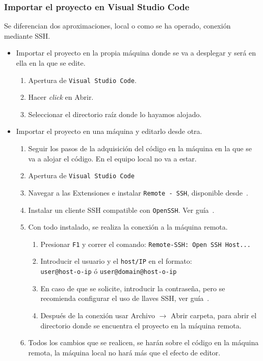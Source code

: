 \subsubsection{Importar el proyecto en Visual Studio Code}
Se diferencian dos aproximaciones, local o como se ha operado, conexión mediante SSH.

\begin{itemize}
\item Importar el proyecto en la propia máquina donde se va a desplegar y será en ella en la que se edite.
\begin{enumerate}
\item Apertura de \texttt{Visual Studio Code}.
\item Hacer \textit{click} en Abrir.
\item Seleccionar el directorio raíz donde lo hayamos alojado.
\end{enumerate}
\item Importar el proyecto en una máquina y editarlo desde otra.
\begin{enumerate}
\item Seguir los pasos de la adquisición del código en la máquina en la que se va a alojar el código. En el equipo local no va a estar.
\item Apertura de \texttt{Visual Studio Code}
\item Navegar a las Extensiones e instalar \texttt{Remote - SSH}, disponible desde~\cite{VSCode-Remote-SSH}.
\item Instalar un cliente SSH compatible con \texttt{OpenSSH}. Ver guía~\cite{Remote-Development-Tricks-Tips}.
\item Con todo instalado, se realiza la conexión a la máquina remota.
\begin{enumerate}
\item Presionar \texttt{F1} y correr el comando: \texttt{Remote-SSH: Open SSH Host...}
\item Introducir el usuario y el \texttt{host/IP} en el formato:\\
\texttt{user@host-o-ip} ó \texttt{user@domain@host-o-ip}
\item En caso de que se solicite, introducir la contraseña, pero se recomienda configurar el uso de llaves SSH, ver guía~\cite{Remote-Development-Tricks-Tips}.
\item Después de la conexión usar Archivo $\rightarrow$ Abrir carpeta, para abrir el directorio donde se encuentra el proyecto en la máquina remota.
\end{enumerate}
\item Todos los cambios que se realicen, se harán sobre el código en la máquina remota, la máquina local no hará más que el efecto de editor.
\end{enumerate}
\end{itemize}

